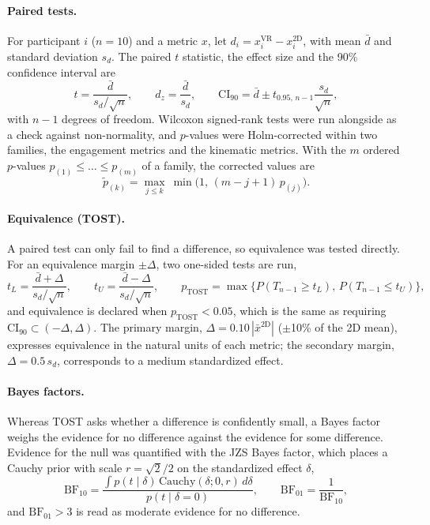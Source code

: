 \documentclass[utf8]{frontiers_suppmat}
\begin{document}
\paragraph*{Paired tests.} For participant $i$ ($n=10$) and a metric $x$, let $d_i=x_i^{\mathrm{VR}}-x_i^{\mathrm{2D}}$, with mean $\bar d$ and standard deviation $s_d$. The paired $t$ statistic, the effect size and the 90\% confidence interval are
\begin{equation}\label{eq:ttest}
t=\frac{\bar d}{s_d/\sqrt n},\qquad d_z=\frac{\bar d}{s_d},\qquad \mathrm{CI}_{90}=\bar d\pm t_{0.95,\,n-1}\frac{s_d}{\sqrt n},
\end{equation}
with $n-1$ degrees of freedom. Wilcoxon signed-rank tests were run alongside as a check against non-normality, and $p$-values were Holm-corrected within two families, the engagement metrics and the kinematic metrics. With the $m$ ordered $p$-values $p_{(1)}\le\dots\le p_{(m)}$ of a family, the corrected values are
\begin{equation}\label{eq:holm}
\tilde p_{(k)}=\max_{j\le k}\ \min\!\big(1,\,(m-j+1)\,p_{(j)}\big).
\end{equation}

\paragraph*{Equivalence (TOST).} A paired test can only fail to find a difference, so equivalence was tested directly. For an equivalence margin $\pm\Delta$, two one-sided tests are run,
\begin{equation}\label{eq:tost}
t_L=\frac{\bar d+\Delta}{s_d/\sqrt n},\qquad t_U=\frac{\bar d-\Delta}{s_d/\sqrt n},\qquad p_{\mathrm{TOST}}=\max\big\{P(T_{n-1}\ge t_L),\,P(T_{n-1}\le t_U)\big\},
\end{equation}
and equivalence is declared when $p_{\mathrm{TOST}}<0.05$, which is the same as requiring $\mathrm{CI}_{90}\subset(-\Delta,\Delta)$. The primary margin, $\Delta=0.10\,|\bar x^{\mathrm{2D}}|$ ($\pm$10\% of the 2D mean), expresses equivalence in the natural units of each metric; the secondary margin, $\Delta=0.5\,s_d$, corresponds to a medium standardized effect.

\paragraph*{Bayes factors.} Whereas TOST asks whether a difference is confidently small, a Bayes factor weighs the evidence for no difference against the evidence for some difference. Evidence for the null was quantified with the JZS Bayes factor, which places a Cauchy prior with scale $r=\sqrt2/2$ on the standardized effect $\delta$,
\begin{equation}\label{eq:bf}
\mathrm{BF}_{10}=\frac{\int p(t\mid\delta)\,\mathrm{Cauchy}(\delta;0,r)\,d\delta}{p(t\mid\delta=0)},\qquad \mathrm{BF}_{01}=\frac1{\mathrm{BF}_{10}} ,
\end{equation}
and $\mathrm{BF}_{01}>3$ is read as moderate evidence for no difference.
\end{document}
